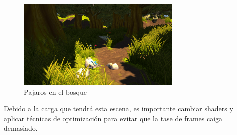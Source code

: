 \begin{figure}[htb]
	\centering
	\includegraphics[width=0.7\textwidth]{./imagenes/forestBirds}
	\caption{Pajaros en el bosque}
\end{figure}

\quad Debido a la carga que tendrá esta escena, es importante cambiar shaders y aplicar técnicas de optimización para evitar que la tase de frames caiga demasiado.

\newpage


